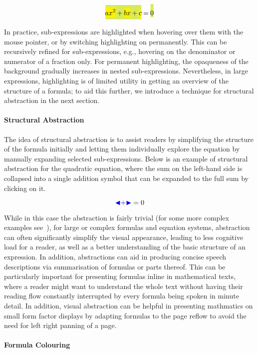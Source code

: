 \documentclass{sig-alternate}
\def\collapse#1{\textcolor{blue}{\ensuremath{\mathord{\blacktriangleleft}
\mathord{#1}
\mathord{\blacktriangleright}}}}
\begin{document}
\def\cb#1{\colorbox{yellow}{\ensuremath{\!\!\displaystyle#1\!\!}}}
\def\cc#1{\colorbox{GreenYellow}{\ensuremath{\!\!\displaystyle#1\!\!}}}
\[\cc{\cb{ax^2} + \cb{bx} + \cb{c}} = \cc{\rule[3ex]{0pt}{0pt}0}\]

In practice, sub-expressions are highlighted when hovering over them with the
mouse pointer, or by switching highlighting on permanently. This can be
recursively refined for sub-expressions, e.g., hovering on the denominator or
numerator of a fraction only. For permanent highlighting, the opaqueness of the
background gradually increases in nested sub-expressions. Nevertheless, in large
expressions, highlighting is of limited utility in getting an overview of the structure
of a formula; to aid this further, we introduce a technique for
structural abstraction in the next section.

\paragraph{Structural Abstraction}

The idea of structural abstraction is to assist readers by simplifying the
structure of the formula initially and letting them individually explore the
equation by manually expanding selected sub-expressions. Below is an example of
structural abstraction for the quadratic equation, where the sum on the
left-hand side is collapsed into a single addition symbol that can be expanded
to the full sum by clicking on it.

\[\collapse{+}=0\]

While in this case the abstraction is fairly trivial (for some more complex
examples see~\cite{cervone2016towards}), for large or complex formulas and
equation systems, abstraction can often significantly simplify the visual
appearance, leading to less cognitive load for a reader, as well as a better
understanding of the basic structure of an expression. In addition, abstractions
can aid in producing concise speech descriptions via summarisation of formulas
or parts thereof. This can be particularly important for presenting formulas
inline in mathematical texts, where a reader might want to understand the whole
text without having their reading flow constantly interrupted by every formula
being spoken in minute detail. In addition, visual abstraction can be helpful in
presenting mathmatics on small form factor displays by adapting formulas to the
page reflow to avoid the need for left right panning of a page.


\paragraph{Formula Colouring}
\end{document}
